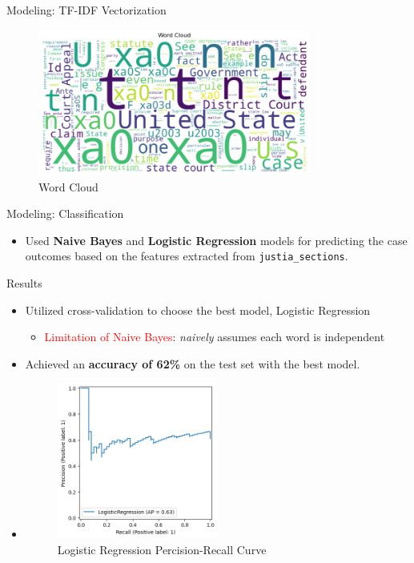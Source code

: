 \documentclass{beamer}
\begin{document}
\begin{frame}{Modeling: TF-IDF Vectorization}
\begin{figure}
        \includegraphics[width=0.8\textwidth]{img/word_cloud.png}
        \caption{ Word Cloud}
\end{figure}
\end{frame}


\begin{frame}{Modeling: Classification}
\begin{itemize}
    \item Used \textbf{Naive Bayes} and \textbf{Logistic Regression} models for predicting the case outcomes based on the features extracted from \texttt{justia\_sections}.
\end{itemize}
\end{frame}


\begin{frame}{Results}
\begin{itemize}
    \item Utilized cross-validation to choose the best model, Logistic Regression   
        \begin{itemize}
            \item \textcolor{red}{Limitation of Naive Bayes}: \textit{naively} assumes each word is independent
        \end{itemize}
    \item Achieved an \textbf{accuracy of 62\%} on the test set with the best model.
    \item \begin{figure}
        \includegraphics[width=0.5\textwidth]{img/logisitic_pr_curve.png}
        \caption{Logistic Regression Percision-Recall Curve}
    \end{figure}
\end{itemize}
\end{frame}
\end{document}
